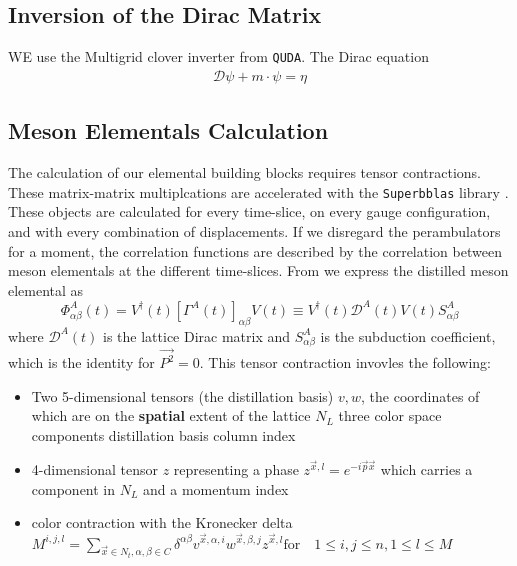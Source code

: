 \subsection{Inversion of the Dirac Matrix}
WE use the Multigrid clover inverter from \texttt{QUDA}. 
The Dirac equation 
\begin{align}
  \mathcal{D}\psi + m \cdot \psi = \eta
\end{align}


\subsection{Meson Elementals Calculation}
The calculation of our elemental building blocks requires tensor contractions. These matrix-matrix multiplcations are accelerated with the \texttt{Superbblas} library \cite{dinapoli2013efficientuseblaslibrary}. These objects are calculated for every time-slice, on every gauge configuration, and with every combination of displacements. If we disregard the perambulators for a moment, the correlation functions are described by the correlation between meson elementals at the different time-slices.  From  we express the distilled meson elemental as 
\begin{equation}
\Phi^A_{\alpha\beta}(t) = V^{\dagger}(t) [\Gamma^A(t)]_{\alpha\beta} V(t) \equiv V^{\dagger}(t)\mathcal{D}^A(t)V(t)S^A_{\alpha\beta}
\end{equation} where $\mathcal{D}^A(t)$ is the lattice Dirac matrix and $S^A_{\alpha\beta}$ is the subduction coefficient, which is the identity for $\vec{P^2} = 0$.  
This tensor contraction invovles the following\cite{romero_efficient_2020}: 
\begin{itemize}
  \item Two 5-dimensional tensors (the distillation basis) $v,w$, the coordinates of which are on the \textbf{spatial} extent of the lattice $N_L$
  \subitem three color space components 
  \subitem distillation basis column index 
  \item  4-dimensional tensor $z$ representing a phase $z^{\vec{x},l} = e^{-i\vec{p}\vec{x}}$ which carries a component in $N_L$ and a momentum index
  \item color contraction with the Kronecker delta 
  \subitem {}$ M^{i,j,l} = \sum_{\vec{x}\in N_t,\alpha,\beta \in C}^{} \delta^{\alpha\beta} v^{\vec{x},\alpha,i}w^{\vec{x},\beta,j} z^{\vec{x},l} \text{for} \quad 1\leq i,j \leq n, 1\leq l \leq M$ 
\end{itemize}


